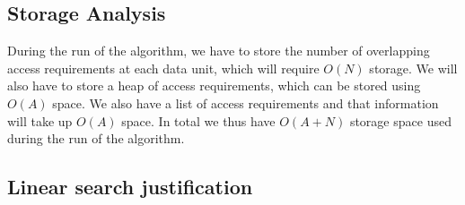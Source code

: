 \subsection{Storage Analysis}

During the run of the algorithm, we have to store the number of overlapping access requirements at each data unit, which will require $O(N)$ storage. We will also have to store a heap of access requirements, which can be stored using $O(A)$ space. We also have a list of access requirements and that information will take up $O(A)$ space. In total we thus have $O(A + N)$ storage space used during the run of the algorithm. 


\subsection{Linear search justification}

